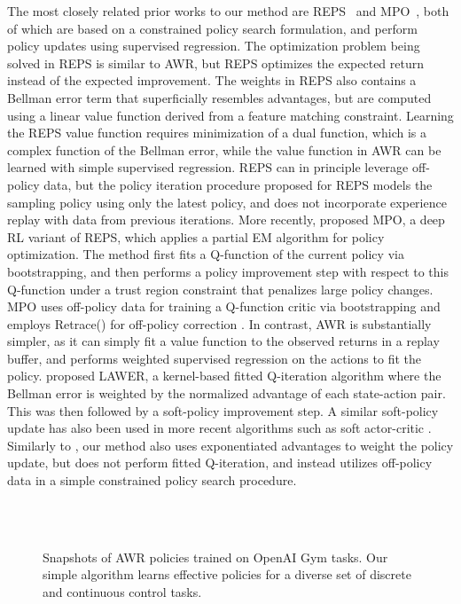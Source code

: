 \documentclass{article} \usepackage{iclr2020_conference,times}
\begin{document}
The most closely related prior works to our method are REPS~\citep{Peters2010REP} and MPO~\citep{abdolmaleki2018maximum}, both of which are based on a constrained policy search formulation, and perform policy updates using supervised regression. 
The optimization problem being solved in REPS is similar to AWR, but REPS optimizes the expected return instead of the expected improvement. The weights in REPS also contains a Bellman error term that superficially resembles advantages, but are computed using a linear value function derived from a feature matching constraint. Learning the REPS value function requires minimization of a dual function, which is a complex function of the Bellman error, while the value function in AWR can be learned with simple supervised regression. REPS can in principle leverage off-policy data, but the policy iteration procedure proposed for REPS models the sampling policy using only the latest policy, and does not incorporate experience replay with data from previous iterations.
More recently, \citet{abdolmaleki2018maximum} proposed MPO, a deep RL variant of REPS, which applies a partial EM algorithm for policy optimization. The method first fits a Q-function of the current policy via bootstrapping, and then performs a policy improvement step with respect to this Q-function under a trust region constraint that penalizes large policy changes. MPO uses off-policy data for training a Q-function critic via bootstrapping and employs Retrace() for off-policy correction \citep{Munos2016}. In contrast, AWR is substantially simpler, as it can simply fit a value function to the observed returns in a replay buffer, and performs weighted supervised regression on the actions to fit the policy.
\citet{Neumann2009Gerhard} proposed LAWER, a kernel-based fitted Q-iteration algorithm where the Bellman error is weighted by the normalized advantage of each state-action pair. This was then followed by a soft-policy improvement step. A similar soft-policy update has also been used in more recent algorithms such as soft actor-critic \citep{haarnoja18b}. Similarly to \citep{Neumann2009Gerhard}, our method also uses exponentiated advantages to weight the policy update, but does not perform fitted Q-iteration, and instead utilizes off-policy data in a simple constrained policy search procedure.

\begin{figure}[t!]
	\centering
    \\
    \vspace{-0.25cm}
    \\
    \vspace{-0.25cm}
\caption{Snapshots of AWR policies trained on OpenAI Gym tasks. Our simple algorithm learns effective policies for a diverse set of discrete and continuous control tasks.}
\label{fig:filmstripsGym}
\end{figure}
\end{document}
